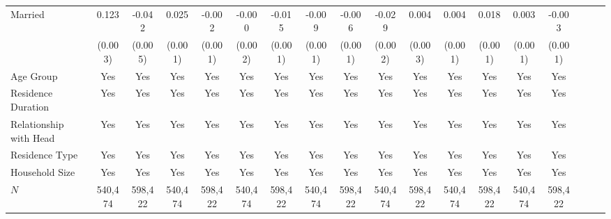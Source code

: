 \documentclass[a4paper,12pt]{article}
\begin{document}
\begin{landscape}
\begin{table}[htbp]
{\begin{tabular}{@{}l*{17}{c}@{}}
\addlinespace
Married   &    0.123\sym{***}&   -0.042\sym{***}&    0.025\sym{***}&   -0.002\sym{***}&   -0.000         &   -0.015\sym{***}&   -0.009\sym{***}&   -0.006\sym{***}&   -0.029\sym{***}&    0.004         &    0.004\sym{***}&    0.018\sym{***}&    0.003\sym{***}&   -0.003\sym{**} \\
          &  (0.003)         &  (0.005)         &  (0.001)         &  (0.001)         &  (0.002)         &  (0.001)         &  (0.001)         &  (0.001)         &  (0.002)         &  (0.003)         &  (0.001)         &  (0.001)         &  (0.001)         &  (0.001)         \\
\addlinespace
Age Group &      Yes         &      Yes         &      Yes         &      Yes         &      Yes         &      Yes         &      Yes         &      Yes         &      Yes         &      Yes         &      Yes         &      Yes         &      Yes         &      Yes         \\
\addlinespace
Residence Duration &      Yes         &      Yes         &      Yes         &      Yes         &      Yes         &      Yes         &      Yes         &      Yes         &      Yes         &      Yes         &      Yes         &      Yes         &      Yes         &      Yes         \\
\addlinespace
Relationship with Head &      Yes         &      Yes         &      Yes         &      Yes         &      Yes         &      Yes         &      Yes         &      Yes         &      Yes         &      Yes         &      Yes         &      Yes         &      Yes         &      Yes         \\
\addlinespace
Residence Type &      Yes         &      Yes         &      Yes         &      Yes         &      Yes         &      Yes         &      Yes         &      Yes         &      Yes         &      Yes         &      Yes         &      Yes         &      Yes         &      Yes         \\
\addlinespace
Household Size &      Yes         &      Yes         &      Yes         &      Yes         &      Yes         &      Yes         &      Yes         &      Yes         &      Yes         &      Yes         &      Yes         &      Yes         &      Yes         &      Yes         \\
\midrule
$\textit{N}$&  540,474         &  598,422         &  540,474         &  598,422         &  540,474         &  598,422         &  540,474         &  598,422         &  540,474         &  598,422         &  540,474         &  598,422         &  540,474         &  598,422         \\

\end{tabular}}
\end{table}
\end{landscape}
\end{document}
